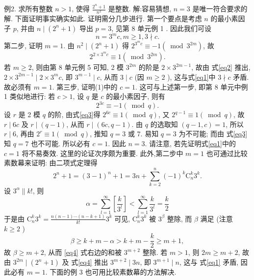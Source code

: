 例2. 求所有整数 $n>1$, 使得 $\frac{2^n+1}{n^2}$ 是整数.
解:容易猜想, $n=3$ 是唯一符合要求的解.
下面证明事实确实如此.
证明需分几步进行.
第一个要点是考虑 $n$ 的最小素因子 $p$, 并由 $n \mid\left(2^n+1\right)$  导出 $p=3$, 见第 8 单元例 1 . 因此我们可设
$$
n=3^m c, m \geqslant 1,3 \nmid c . \label{eq1}
$$
第二步, 证明 $m=1$. 由 $n^2 \mid\left(2^n+1\right)$ 得 $2^{3^m c} \equiv-1\left(\bmod 3^{2 m}\right)$, 故
$$
2^{2 \times 3^m c} \equiv 1\left(\bmod 3^{2 m}\right) . \label{eq2}
$$
若 $m \geqslant 2$, 则由第 8 单元例 5 可知, 2 模 $3^{2 m}$ 的阶是 $2 \times 3^{2 m-1}$, 故由 式\ref{eq2} 推出, $2 \times 3^{2 m-1} \mid 2 \times 3^m c$, 即 $3^{m-1} \mid c$, 从而 $3 \mid c$ (因 $m \geqslant 2$ ), 这与式\ref{eq1}中 $3 \nmid c$ 矛盾.
故必须有 $m=1$.
第三步, 证明(1)中的 $c=1$. 这可与上述第一步, 即第 8 单元中例 1 类似地进行:
若 $c>1$, 设 $q$ 是 $c$ 的最小素因子, 则有
$$
2^{3 c} \equiv-1(\bmod q) . \label{eq3}
$$
设 $r$ 是 2 模 $q$ 的阶, 由式\ref{eq3}得 $2^{6 c} \equiv 1(\bmod q)$, 又 $2^{q-1} \equiv 1(\bmod q)$, 故 $r \mid 6 c$ 及 $r \mid(q-1)$, 从而 $r \mid(6 c, q-1)$. 由 $q$ 的选取知 $(q-1, c)=1$, 所以 $r \mid 6$, 再由 $2^r \equiv 1(\bmod q)$, 推知 $q=3$ 或 7. 易知 $q=3$ 为不可能; 而由 式\ref{eq3} 知 $q=7$ 也不可能.
所以必有 $c=1$. 因此 $n=3$.
请注意, 若先证明式\ref{eq1}中的 $c=1$ 将不易奏效.
这里的论证次序颇为重要.
此外,第二步中 $m=1$ 也可通过比较素数幕来证明:
由二项式定理得
$$
2^n+1=(3-1)^n+1=3 n+\sum_{k=2}^n(-1)^k \mathrm{C}_n^k 3^k . \label{eq4}
$$
设 $3^\alpha \| k !$, 则
$$
\alpha=\sum_{l=1}^{\infty}\left[\frac{k}{3^l}\right]<\sum_{l=1}^{\infty} \frac{k}{3^l}=\frac{k}{2}
$$
于是由 $\mathrm{C}_n^k 3^k=\frac{n(n-1) \cdots(n-k+1)}{k !} 3^k$ 可见, $\mathrm{C}_n^k 3^k$ 被 $3^\beta$ 整除, 而 $\beta$ 满足 (注意 $k \geqslant 2$ )
$$
\beta \geqslant k+m-\alpha>k+m-\frac{k}{2} \geqslant m+1,
$$
故 $\beta \geqslant m+2$, 从而 \ref{eq4} 式右边的和被 $3^{m+2}$ 整除.
若 $m>1$, 则 $2 m \geqslant m+2$, 故由 $3^{2 m} \mid\left(2^n+1\right)$ 及 式\ref{eq4} 推出 $3^{m+2} \mid 3 n$, 即 $3^{m+1} \mid n$, 这与 式\ref{eq1} 矛盾, 因此必有 $m=1$. 下面的例 3 也可用比较素数幕的方法解决.



